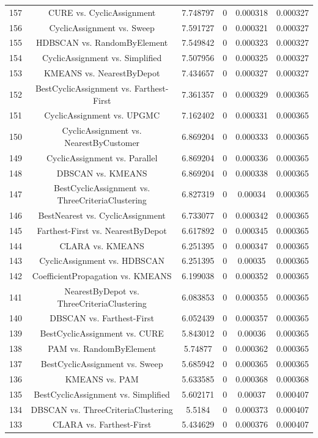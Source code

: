 \documentclass[a4paper,10pt]{article}
\begin{document}
\begin{landscape}
\begin{table}[!htp]
\begin{tabular}{cccccc}
157&CURE vs. CyclicAssignment&7.748797&0&0.000318&0.000327\\
156&CyclicAssignment vs. Sweep&7.591727&0&0.000321&0.000327\\
155&HDBSCAN vs. RandomByElement&7.549842&0&0.000323&0.000327\\
154&CyclicAssignment vs. Simplified&7.507956&0&0.000325&0.000327\\
153&KMEANS vs. NearestByDepot&7.434657&0&0.000327&0.000327\\
152&BestCyclicAssignment vs. Farthest-First&7.361357&0&0.000329&0.000365\\
151&CyclicAssignment vs. UPGMC&7.162402&0&0.000331&0.000365\\
150&CyclicAssignment vs. NearestByCustomer&6.869204&0&0.000333&0.000365\\
149&CyclicAssignment vs. Parallel&6.869204&0&0.000336&0.000365\\
148&DBSCAN vs. KMEANS&6.869204&0&0.000338&0.000365\\
147&BestCyclicAssignment vs. ThreeCriteriaClustering&6.827319&0&0.00034&0.000365\\
146&BestNearest vs. CyclicAssignment&6.733077&0&0.000342&0.000365\\
145&Farthest-First vs. NearestByDepot&6.617892&0&0.000345&0.000365\\
144&CLARA vs. KMEANS&6.251395&0&0.000347&0.000365\\
143&CyclicAssignment vs. HDBSCAN&6.251395&0&0.00035&0.000365\\
142&CoefficientPropagation vs. KMEANS&6.199038&0&0.000352&0.000365\\
141&NearestByDepot vs. ThreeCriteriaClustering&6.083853&0&0.000355&0.000365\\
140&DBSCAN vs. Farthest-First&6.052439&0&0.000357&0.000365\\
139&BestCyclicAssignment vs. CURE&5.843012&0&0.00036&0.000365\\
138&PAM vs. RandomByElement&5.74877&0&0.000362&0.000365\\
137&BestCyclicAssignment vs. Sweep&5.685942&0&0.000365&0.000365\\
136&KMEANS vs. PAM&5.633585&0&0.000368&0.000368\\
135&BestCyclicAssignment vs. Simplified&5.602171&0&0.00037&0.000407\\
134&DBSCAN vs. ThreeCriteriaClustering&5.5184&0&0.000373&0.000407\\
133&CLARA vs. Farthest-First&5.434629&0&0.000376&0.000407\\

\end{tabular}
\end{table}
\end{landscape}
\end{document}
